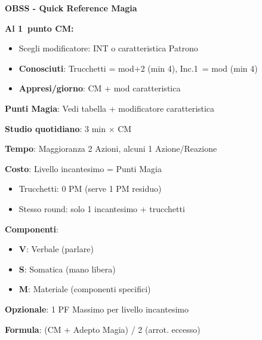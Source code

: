 \documentclass[10pt,a4paper,landscape]{article}
\begin{document}
	
	\begin{center}
		{\Huge\textbf{OBSS - Quick Reference Magia}}
	\end{center}
	
	\begin{multicols}{3}
		
		
		\begin{tcolorbox}[title=SETUP INIZIALE]
			\textbf{Al 1\textordmasculine\ punto CM:}
			\begin{itemize}[leftmargin=*,noitemsep]
				\item Scegli modificatore: INT o caratteristica Patrono
				\item \textbf{Conosciuti}: Trucchetti = mod+2 (min 4), Inc.1\textordmasculine\ = mod (min 4)
				\item \textbf{Appresi/giorno}: CM + mod caratteristica
			\end{itemize}
			
			\textbf{Punti Magia}: Vedi tabella + modificatore caratteristica
			
			\textbf{Studio quotidiano}: 3 min $\times$ CM
		\end{tcolorbox}
		
		\begin{tcolorbox}[title=LANCIO INCANTESIMI]
			\textbf{Tempo}: Maggioranza 2 Azioni, alcuni 1 Azione/Reazione
			
			\textbf{Costo}: Livello incantesimo = Punti Magia
			\begin{itemize}[leftmargin=*,noitemsep]
				\item Trucchetti: 0 PM (serve 1 PM residuo)
				\item Stesso round: solo 1 incantesimo + trucchetti
			\end{itemize}
			
			\textbf{Componenti}:
			\begin{itemize}[leftmargin=*,noitemsep]
				\item \textbf{V}: Verbale (parlare)
				\item \textbf{S}: Somatica (mano libera)
				\item \textbf{M}: Materiale (componenti specifici)
			\end{itemize}
			
			\textbf{Opzionale}: 1 PF Massimo per livello incantesimo
		\end{tcolorbox}
		
		\begin{tcolorbox}[title=MASSIMO LIVELLO INCANTESIMI]
			\textbf{Formula}: (CM + Adepto Magia) / 2 (arrot. eccesso)
			

\end{tcolorbox}
\end{multicols}
\end{document}
